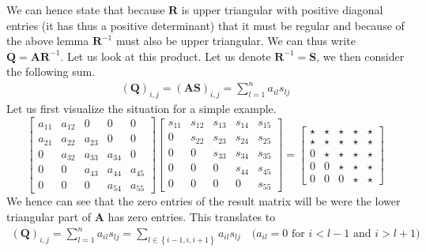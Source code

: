 \documentclass{article}
\begin{document}
\noindent We can hence state that because $\mathbf{R}$ is upper triangular with positive diagonal entries (it has thus a positive determinant) that it must be regular and because of the above lemma $\mathbf{R}^{-1}$ must also be upper triangular. We can thus write $\mathbf{Q} = \mathbf{A}\mathbf{R}^{-1}$. Let us look at this product. Let us denote $\mathbf{R}^{-1} = \mathbf{S}$, we then consider the following sum.
\begin{align*}
    \left(\mathbf{Q}\right)_{i,j} = \left(\mathbf{A}\mathbf{S}\right)_{i,j} = \sum_{l=1}^{n}a_{il}s_{lj}
\end{align*}
Let us first visualize the situation for a simple example.
\begin{equation*}
    \begin{bmatrix}
        a_{11} & a_{12} & 0 & 0 & 0\\
        a_{21} & a_{22} & a_{23} & 0 & 0 \\
        0 & a_{32} & a_{33} & a_{34} & 0 \\
        0 & 0 & a_{43} & a_{44} & a_{45} \\
        0 & 0 & 0 & a_{54} & a_{55}
    \end{bmatrix}
    \begin{bmatrix}
        s_{11} & s_{12} & s_{13} & s_{14} & s_{15} \\
        0 & s_{22} & s_{23} & s_{24} & s_{25} \\
        0 & 0 & s_{33} & s_{34} & s_{35} \\
        0 & 0 & 0 & s_{44} & s_{45} \\
        0 & 0 & 0 & 0 & s_{55}
    \end{bmatrix} = 
    \begin{bmatrix}
        \star & \star & \star & \star & \star \\
        \star & \star & \star & \star & \star \\
        0 & \star & \star & \star & \star \\
        0 & 0 & \star & \star & \star \\
        0 & 0 & 0& \star & \star
    \end{bmatrix}
\end{equation*}
We hence can see that the zero entries of the result matrix will be were the lower triangular part of $\mathbf{A}$ has zero entries. This translates to
\begin{align*}
   \left(\mathbf{Q}\right)_{i,j} = \sum_{l=1}^{n}a_{il}s_{lj} = \sum_{l \in \left\{i - 1, i, i+1\right\}} a_{il}s_{lj} \quad \text{($a_{il} = 0 \text{ for } i < l - 1$ and $i > l + 1$)}
\end{align*}
\end{document}
